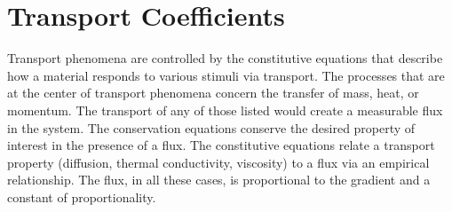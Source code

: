\section{Transport Coefficients}
Transport phenomena are controlled by the constitutive equations that describe how a material responds to various stimuli via transport.
The processes that are at the center of transport phenomena concern the transfer of mass, heat, or momentum. The transport of any of those listed would create a measurable flux in the system. The conservation equations conserve the desired property of interest in the presence of a flux.
The constitutive equations relate a transport property (diffusion, thermal conductivity, viscosity) to a flux via an empirical relationship. The flux, in all these cases, is proportional to the gradient and a constant of proportionality.

